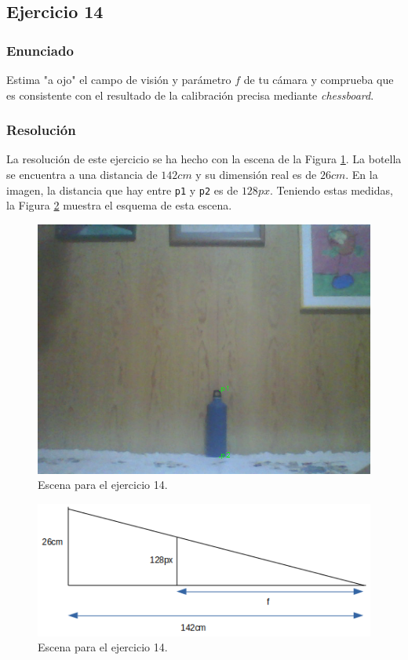 \documentclass[a4paper,10pt,titlepage,oneside,openright]{book}
\begin{document}
\medskip \newpage
\subsection{Ejercicio 14}

\subsubsection*{Enunciado}
Estima "a ojo" el campo de visión y parámetro $f$ de tu cámara y comprueba que es consistente con el resultado de la calibración precisa mediante \textit{chessboard}.

\subsubsection*{Resolución}
La resolución de este ejercicio se ha hecho con la escena de la Figura \ref{scene}. La botella se encuentra a una distancia de $142cm$ y su dimensión real es de $26cm$. En la imagen, la distancia que hay entre \texttt{p1} y \texttt{p2} es de $128px$. Teniendo estas medidas, la Figura \ref{schema} muestra el esquema de esta escena.
\begin{figure}[!th]
\includegraphics[scale=0.4]{image} 
\centering
\caption{Escena para el ejercicio 14.}
\label{scene}
\end{figure}
\begin{figure}[!th]
\includegraphics[scale=0.5]{schema} 
\centering
\caption{Escena para el ejercicio 14.}
\label{schema}
\end{figure}
\end{document}
